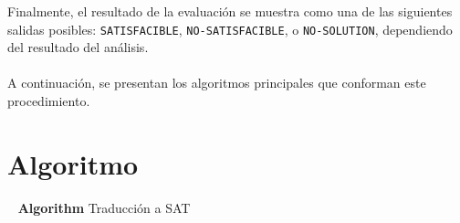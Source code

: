 \documentclass{article}
\begin{document}
Finalmente, el resultado de la evaluación se muestra como una de las siguientes salidas posibles: \texttt{SATISFACIBLE}, \texttt{NO-SATISFACIBLE}, o \texttt{NO-SOLUTION}, dependiendo del resultado del análisis.\\\\
A continuación, se presentan los algoritmos principales que conforman este procedimiento.

\newpage
\section{Algoritmo}
~
\newline
\newline
\textbf{Algorithm} Traducción a SAT
\newline
\newline
\end{document}
